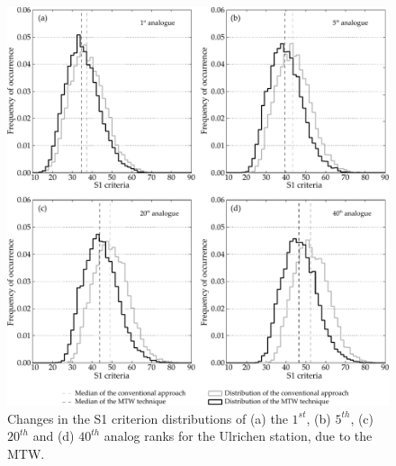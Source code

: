 \documentclass[hess, manuscript]{copernicus}
\begin{document}
\begin{figure}[htb]
	\begin{center}
		\includegraphics[width=15cm]{figures/changes_S1_analogues.pdf}
	\end{center}
	\caption{Changes in the S1 criterion distributions of (a) the $1^{st}$, (b) $5^{th}$, (c) $20^{th}$ and (d) $40^{th}$ analog ranks for the Ulrichen station, due to the MTW.}
	\label{fig:changes_S1_analogs}
\end{figure}
\end{document}
